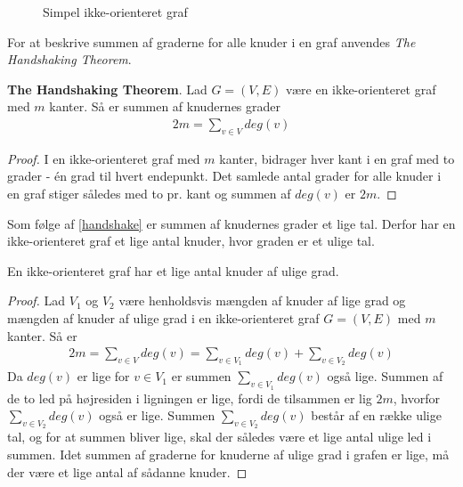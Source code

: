 \begin{figure}[h]
\centering
{}
\caption{Simpel ikke-orienteret graf} \label{eksempel_nabo}
\end{figure}

For at beskrive summen af graderne for alle knuder i en graf anvendes \textit{The Handshaking Theorem}. 

\begin{thm}\label{handshake}
\textbf{The Handshaking Theorem}. Lad $G=(V,E)$ være en ikke-orienteret graf med $m$ kanter. Så er summen af knudernes grader \\
\begin{align*}
2m=\sum_{v \in V}deg(v)
\end{align*}
\end{thm}

\begin{proof}
I en ikke-orienteret graf med $m$ kanter, bidrager hver kant i en graf med to grader - én grad til hvert endepunkt. Det samlede antal grader for alle knuder i en graf stiger således med to pr. kant og summen af $deg(v)$ er $2m$. 
\end{proof}

Som følge af \ref{handshake} er summen af knudernes grader et lige tal. Derfor har en ikke-orienteret graf et lige antal knuder, hvor graden er et ulige tal.

\begin{thm}
En ikke-orienteret graf har et lige antal knuder af ulige grad. 
\end{thm}

\begin{proof}
Lad $V_1$ og $V_2$ være henholdsvis mængden af knuder af lige grad og mængden af knuder af ulige grad i en ikke-orienteret graf $G=(V,E)$ med $m$ kanter. Så er \\
\begin{align*}
2m=\sum_{v \in V}deg(v)=\sum_{v \in V_1}deg(v)+ \sum_{v \in V_2}deg(v)
\end{align*}
Da $deg(v)$ er lige for $v \in V_1$ er summen $\sum_{v \in V_1}deg(v)$ også lige. Summen af de to led på højresiden i ligningen er lige, fordi de tilsammen er lig $2m$, hvorfor $\sum_{v \in V_2}deg(v)$ også er lige. Summen $\sum_{v \in V_2}deg(v)$ består af en række ulige tal, og for at summen bliver lige, skal der således være et lige antal ulige led i summen.
Idet summen af graderne for knuderne af ulige grad i grafen er lige, må der være et lige antal af sådanne knuder.
\end{proof}




